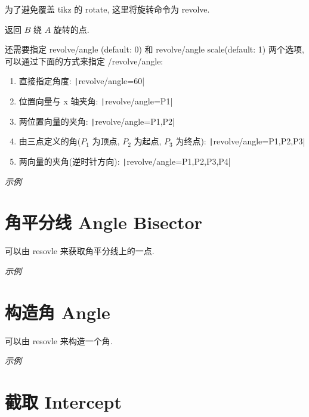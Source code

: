 \begin{remark*}
  为了避免覆盖 tikz 的 rotate, 这里将旋转命令为 revolve.
\end{remark*}

返回 $B$ 绕 $A$ 旋转的点.

还需要指定 revolve/angle (default: 0) 和 revolve/angle scale(default: 1) 两个选项,可以通过下面的方式来指定 /revolve/angle:

\begin{enumerate}
  \item 直接指定角度: \texttt|revolve/angle=60|
  \item 位置向量与 x 轴夹角: \texttt|revolve/angle={P1}|
  \item 两位置向量的夹角: \texttt|revolve/angle={P1,P2}|
  \item 由三点定义的角($P_1$ 为顶点, $P_2$ 为起点, $P_3$ 为终点): \texttt|revolve/angle={P1,P2,P3}|
  \item 两向量的夹角(逆时针方向): \texttt|revolve/angle={P1,P2,P3,P4}|
\end{enumerate}

\emph{示例}




\section{角平分线 Angle Bisector}

可以由 resovle 来获取角平分线上的一点.

\emph{示例}


\section{构造角 Angle}

可以由 resovle 来构造一个角.

\emph{示例}


\section{截取 Intercept}

